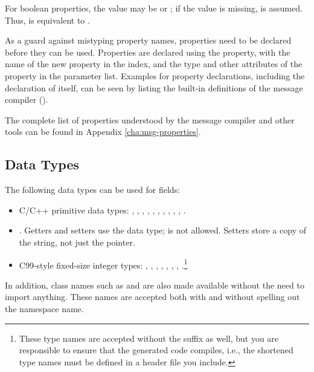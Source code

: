 For boolean properties, the value may be  or ; if
the value is missing,  is assumed. Thus,  is
equivalent to .

As a guard against mistyping property names, properties need to be declared
before they can be used. Properties are declared using the 
property, with the name of the new property in the index, and the type and other
attributes of the property in the parameter list. Examples for property
declarations, including the declaration of  itself, can be seen
by listing the built-in definitions of the message compiler
().

The complete list of properties understood by the message compiler and other {\opp}
tools can be found in Appendix \ref{cha:msg-properties}.


\subsection{Data Types}
\label{sec:msg-defs:field-data-types}

The following data types can be used for fields:

\begin{itemize}
  \item C/C++ primitive data types: , ,
    , , , ,
    , , , , .
  \item {}. Getters and setters use the  data
    type;  is not allowed. Setters store a copy of the string, not
    just the pointer.
  \item C99-style fixed-size integer types: ,
    , , ,
    , , ,
    .\footnote{These type names are accepted without the
     suffix as well, but you are responsible to ensure that the
    generated code compiles, i.e., the shortened type names must be defined in a
    header file you include.}
\end{itemize}

In addition, {\opp} class names such as  and  are
also made available without the need to import anything. These names are
accepted both with and without spelling out the  namespace
name.

